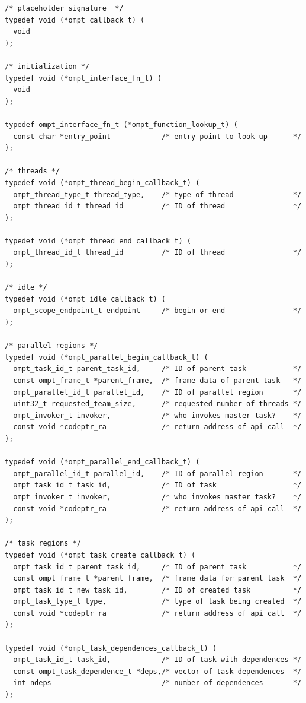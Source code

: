 \documentclass{article}
\begin{document}
\begin{verbatim}
/* placeholder signature  */
typedef void (*ompt_callback_t) (    
  void
);

/* initialization */
typedef void (*ompt_interface_fn_t) (
  void
);

typedef ompt_interface_fn_t (*ompt_function_lookup_t) (
  const char *entry_point            /* entry point to look up      */
);

/* threads */
typedef void (*ompt_thread_begin_callback_t) (
  ompt_thread_type_t thread_type,    /* type of thread              */
  ompt_thread_id_t thread_id         /* ID of thread                */
);

typedef void (*ompt_thread_end_callback_t) (
  ompt_thread_id_t thread_id         /* ID of thread                */
);

/* idle */
typedef void (*ompt_idle_callback_t) ( 
  ompt_scope_endpoint_t endpoint     /* begin or end                */
);

/* parallel regions */
typedef void (*ompt_parallel_begin_callback_t) (
  ompt_task_id_t parent_task_id,     /* ID of parent task           */
  const ompt_frame_t *parent_frame,  /* frame data of parent task   */
  ompt_parallel_id_t parallel_id,    /* ID of parallel region       */
  uint32_t requested_team_size,      /* requested number of threads */
  ompt_invoker_t invoker,            /* who invokes master task?    */
  const void *codeptr_ra             /* return address of api call  */ 
);

typedef void (*ompt_parallel_end_callback_t) (
  ompt_parallel_id_t parallel_id,    /* ID of parallel region       */
  ompt_task_id_t task_id,            /* ID of task                  */
  ompt_invoker_t invoker,            /* who invokes master task?    */
  const void *codeptr_ra             /* return address of api call  */ 
);

/* task regions */
typedef void (*ompt_task_create_callback_t) ( 
  ompt_task_id_t parent_task_id,     /* ID of parent task           */
  const ompt_frame_t *parent_frame,  /* frame data for parent task  */
  ompt_task_id_t new_task_id,        /* ID of created task          */
  ompt_task_type_t type,             /* type of task being created  */ 
  const void *codeptr_ra             /* return address of api call  */ 
);

typedef void (*ompt_task_dependences_callback_t) (                                   
  ompt_task_id_t task_id,            /* ID of task with dependences */
  const ompt_task_dependence_t *deps,/* vector of task dependences  */
  int ndeps                          /* number of dependences       */
);


\end{verbatim}
\end{document}
